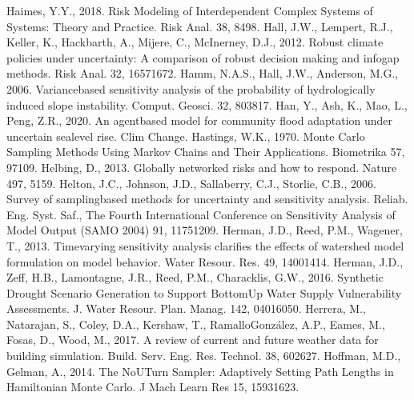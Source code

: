 \documentclass[letterpaper,10pt,english]{sphinxmanual}
\begin{document}
Haimes, Y.Y., 2018. Risk Modeling of Interdependent Complex Systems of Systems: Theory and Practice. Risk Anal. 38, 84\textendash{}98. 
Hall, J.W., Lempert, R.J., Keller, K., Hackbarth, A., Mijere, C., McInerney, D.J., 2012. Robust climate policies under uncertainty: A comparison of robust decision making and info\sphinxhyphen{}gap methods. Risk Anal. 32, 1657\textendash{}1672. 
Hamm, N.A.S., Hall, J.W., Anderson, M.G., 2006. Variance\sphinxhyphen{}based sensitivity analysis of the probability of hydrologically induced slope instability. Comput. Geosci. 32, 803\textendash{}817. 
Han, Y., Ash, K., Mao, L., Peng, Z.\sphinxhyphen{}R., 2020. An agent\sphinxhyphen{}based model for community flood adaptation under uncertain sea\sphinxhyphen{}level rise. Clim Change. 
Hastings, W.K., 1970. Monte Carlo Sampling Methods Using Markov Chains and Their Applications. Biometrika 57, 97\textendash{}109. 
Helbing, D., 2013. Globally networked risks and how to respond. Nature 497, 51\textendash{}59. 
Helton, J.C., Johnson, J.D., Sallaberry, C.J., Storlie, C.B., 2006. Survey of sampling\sphinxhyphen{}based methods for uncertainty and sensitivity analysis. Reliab. Eng. Syst. Saf., The Fourth International Conference on Sensitivity Analysis of Model Output (SAMO 2004) 91, 1175\textendash{}1209. 
Herman, J.D., Reed, P.M., Wagener, T., 2013. Time\sphinxhyphen{}varying sensitivity analysis clarifies the effects of watershed model formulation on model behavior. Water Resour. Res. 49, 1400\textendash{}1414. 
Herman, J.D., Zeff, H.B., Lamontagne, J.R., Reed, P.M., Characklis, G.W., 2016. Synthetic Drought Scenario Generation to Support Bottom\sphinxhyphen{}Up Water Supply Vulnerability Assessments. J. Water Resour. Plan. Manag. 142, 04016050. 
Herrera, M., Natarajan, S., Coley, D.A., Kershaw, T., Ramallo\sphinxhyphen{}González, A.P., Eames, M., Fosas, D., Wood, M., 2017. A review of current and future weather data for building simulation. Build. Serv. Eng. Res. Technol. 38, 602\textendash{}627. 
Hoffman, M.D., Gelman, A., 2014. The No\sphinxhyphen{}U\sphinxhyphen{}Turn Sampler: Adaptively Setting Path Lengths in Hamiltonian Monte Carlo. J Mach Learn Res 15, 1593\textendash{}1623.
\end{document}
